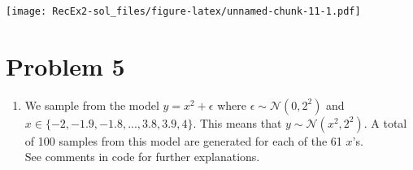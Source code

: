\documentclass[
]{article}
\providecommand{\tightlist}{%
  \setlength{\itemsep}{0pt}\setlength{\parskip}{0pt}}
\begin{document}
\texttt{[image: RecEx2-sol\_files/figure-latex/unnamed-chunk-11-1.pdf]}

\hypertarget{problem-5}{%
\section{Problem 5}\label{problem-5}}

\begin{enumerate}
\def\labelenumi{\alph{enumi})}
\tightlist
\item
  We sample from the model \(y=x^2+\epsilon\) where
  \(\epsilon \sim \mathcal{N}(0,2^2)\) and
  \(x\in \{-2,-1.9,-1.8,...,3.8,3.9,4\}\). This means that
  \(y \sim \mathcal{N}(x^2,2^2)\). A total of 100 samples from this
  model are generated for each of the 61 \(x\)'s.\\
  See comments in code for further explanations.
\end{enumerate}
\end{document}
